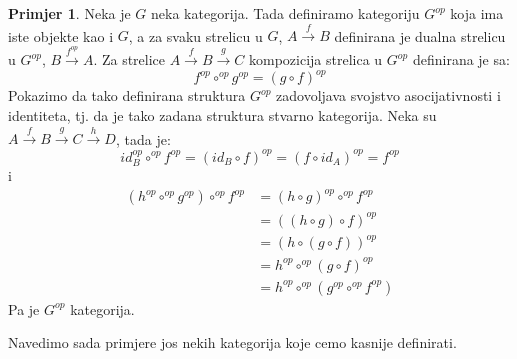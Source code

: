 \documentclass[11pt]{article}
\theoremstyle{definition}
\newtheorem{primjer}{Primjer}
\begin{document}
  \begin{primjer}
    Neka je $G$ neka kategorija. Tada definiramo kategoriju $G^{op}$ koja ima
    iste objekte kao i $G$, a za svaku strelicu u $G$, $A \xrightarrow{f} B$
    definirana je dualna strelicu u $G^{op}$, $B \xrightarrow{f^{op}} A$.
    Za strelice $A \xrightarrow{f} B \xrightarrow{g} C$ kompozicija strelica
    u $G^{op}$ definirana je sa:
    \begin{equation*}
      f^{op} \circ^{op} g^{op} = (g \circ f)^{op}
    \end{equation*}
    Pokazimo da tako definirana struktura $G^{op}$ zadovoljava svojstvo
    asocijativnosti i identiteta, tj. da je tako zadana struktura stvarno
    kategorija.
    Neka su $A \xrightarrow{f} B \xrightarrow{g} C \xrightarrow{h} D$, tada je:
    \begin{equation*}
      id^{op}_B \circ^{op} f^{op} = (id_B \circ f)^{op} = (f \circ id_A)^{op} =
      f^{op}
    \end{equation*}
    i
    \begin{align*}
      (h^{op} \circ^{op} g^{op}) \circ^{op} f^{op} &= (h \circ g)^{op} \circ^{op} f^{op}\\
      &= ((h \circ g) \circ f)^{op}\\
      &= (h \circ (g \circ f))^{op}\\
      &= h^{op} \circ^{op} (g \circ f)^{op}\\
      &= h^{op} \circ^{op} (g^{op} \circ^{op} f^{op})
    \end{align*}
    Pa je $G^{op}$ kategorija.
  \end{primjer}
  Navedimo sada primjere jos nekih kategorija koje cemo kasnije definirati.
\end{document}

